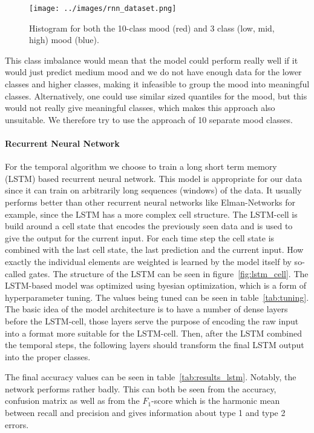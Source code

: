 \begin{figure}
    \centering
    \texttt{[image: ../images/rnn\_dataset.png]}
    \caption{Histogram for both the 10-class mood (red) and 3 class (low, mid, high) mood (blue).}
    \label{fig:mood_bag_hist}
\end{figure}
This class imbalance would mean that the model could perform really well if it would just predict medium mood and we do not
have enough data for the lower classes and higher classes, making it infeasible to group the mood into meaningful classes.
Alternatively, one could use similar sized quantiles for the mood, but this would not really give meaningful classes,
which makes this approach also unsuitable. We therefore try to use the approach of 10 separate mood classes.

\paragraph*{Recurrent Neural Network}
For the temporal algorithm we choose to train a long short term memory (LSTM) based recurrent neural network. This model is
appropriate for our data since it can train on arbitrarily long sequences (windows) of the data. It usually performs better
than other recurrent neural networks like Elman-Networks for example, since the LSTM has a more complex cell structure.
The LSTM-cell is build around a cell state that encodes the previously seen data and is used to give the output for the current
input. For each time step the cell state is combined with the last cell state, the last prediction and the current input.
How exactly the individual elements are weighted is learned by the model itself by so-called gates. The structure of the 
LSTM can be seen in figure~\ref{fig:lstm_cell}. The LSTM-based model was optimized using byesian optimization, which is a form
of hyperparameter tuning. The values being tuned can be seen in table~\ref{tab:tuning}. The basic idea of the model
architecture is to have a number of dense layers before the LSTM-cell, those layers serve the purpose of encoding
the raw input into a format more suitable for the LSTM-cell. Then, after the LSTM combined the temporal steps, the following
layers should transform the final LSTM output into the proper classes. 

The final accuracy values can be seen in table~\ref{tab:results_lstm}. Notably, the network performs rather badly. This
can both be seen from the accuracy, confusion matrix as well as from the $F_1$-score which is the harmonic mean between 
recall and precision and gives information about type 1 and type 2 errors.


